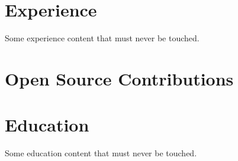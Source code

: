\documentclass{article}
\begin{document}
\section*{Experience}
Some experience content that must never be touched.

\section*{Open Source Contributions}

\section*{Education}
Some education content that must never be touched.
\end{document}
